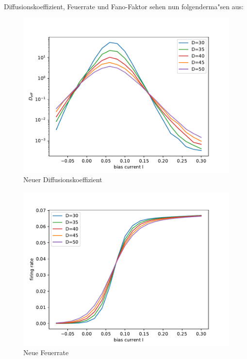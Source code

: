\documentclass[12pt,a4paper]{article}
\begin{document}
Diffusionskoeffizient, Feuerrate und Fano-Faktor sehen nun folgenderma"sen aus:
\begin{figure}[H]
	\centering
	\includegraphics[scale=0.9]{dneurrealfast11jjem2shrealfast11jjem2strealfast19jjem2st.pdf}
	\caption{Neuer Diffusionskoeffizient}
	\label{deff}
\end{figure}
\begin{figure}[H]
	\centering
	\includegraphics[scale=0.9]{gneurrealfast11jjem2shrealfast11jjem2strealfast19jjem2st.pdf}
	\caption{Neue Feuerrate}
	\label{g}
\end{figure}
\end{document}
